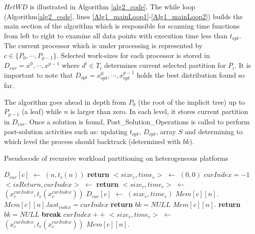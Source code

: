 \documentclass[12pt]{article}
\begin{document}
$HetWD$ is illustrated in Algorithm \ref{alg2_code}. The while loop (Algorithm\ref{alg2_code}, lines \ref{Alg1_mainLoop1}-\ref{Alg1_mainLoop2}) builds the main section of the algorithm which is responsible for scanning time functions from left to right to examine all data points with execution time less than $t_{opt}$. The current processor which is under processing is represented by $c \in \{P_0,\cdots,P_{p-1}\}$. Selected work-sizes for each processor is stored in $D_{cur}={x^0,\cdots,x^{p-1}}$ where $d^i \in T_i$ determines current selected partition for $P_i$. It is important to note that $D_{opt}={x_{opt}^0,\cdots,x_{opt}^{p-1}}$ holds the best distribution found so far. 

The algorithm goes ahead in depth from $P_0$ (the root of the implicit tree) up to $P_{p-1}$ (a leaf) while $n$ is larger than zero. In each level, it stores current partition in $D_{cur}$. Once a solution is found, Post\_Solution\_Operations is called to perform post-solution activities such as: updating $t_{opt}$, $D_{opt}$, array $S$ and determining to which level the process should backtrack (determined with $bk$).

\begin{algorithm}
\scriptsize
\caption{Pseudocode of recursive workload partitioning on heterogeneous platforms} \label{alg2_code}
\begin{algorithmic}[1]	
\Statex
		\label{Alg1_leaf1}
			\State $D_{cur}[c]$ $\gets$ $(n,t_c(n))$
			\State {}
		\EndIf
		\State \textbf{return}	
	\EndIf				\label{Alg1_leaf2}
	\State $<size_c,time_c>$ $\gets$ $(0,0)$
	\State $curIndex=-1$
		\label{retrieveMem1}
		\State $<isReturn,curIndex>$ $\gets$ 
			\State \textbf{return}
		\Else
			\State $<size_c,time_c>$ $\gets$ $(x_c^{curIndex},t_c(x_c^{curIndex}))$
		\EndIf
	\EndIf							\label{retrieveMem2}
	 \label{Alg1_mainLoop1}
			\label{Alg1_non_leaf1}
			\State $D_{cur}[c]$ $\gets$ $(size_c, time_c)$
				\State {}
			\Else
				\State {}	\label{Alg1_recall}
			\EndIf
					\State $Mem[c][n].$
				\Else
					\State $Mem[c][n].last_{index} = curIndex$ \label{alg1_lastIndex}
				\EndIf		
				\State \textbf{return}
				\State $bk = NULL$
				\State $Mem[c][n].$
				\State \textbf{return}
			\Else
				\State $bk = NULL$
			\EndIf
		\EndIf	\label{Alg1_non_leaf2}
			\State \textbf{break}	
		\EndIf
		\State $curIndex++$
		\State $<size_c,time_c>$ $\gets$ $(x_c^{curIndex},t_c(x_c^{curIndex}))$
	\EndWhile	\label{Alg1_mainLoop2}		
	\State $Mem[c][n].$			
\EndFunction		
\end{algorithmic}
\end{algorithm}
\end{document}
